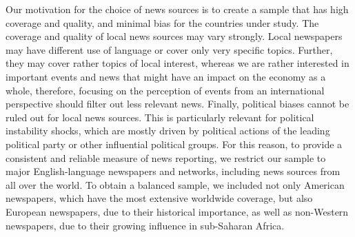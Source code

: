 \documentclass[12pt,a4paper,fleqn]{article}
\begin{document}
Our motivation for the choice of news sources is to create a sample that has high coverage and quality, and minimal bias for the countries under study. The coverage and quality of local news sources may vary strongly. Local newspapers may have different use of language or cover only very specific topics. Further, they may cover rather topics of local interest, whereas we are rather interested in important events and news that might have an impact on the economy as a whole, therefore, focusing on the perception of events from an international perspective should filter out less relevant news. Finally, political biases cannot be ruled out for local news sources. This is particularly relevant for political instability shocks, which are mostly driven by political actions of the leading political party or other influential political groups. For this reason, to provide a consistent and reliable measure of news reporting, we restrict our sample to major English-language newspapers and networks, including news sources from all over the world. To obtain a balanced sample, we included not only American newspapers, which have the most extensive worldwide coverage, but also European newspapers, due to their historical importance, as well as non-Western newspapers, due to their growing influence in sub-Saharan Africa. 
\end{document}
